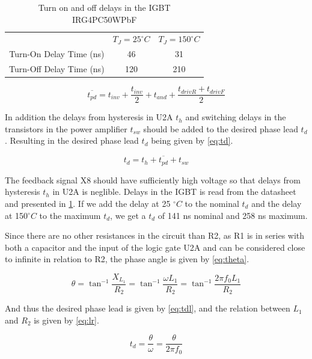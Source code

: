 \begin{table}[H]
    \centering
    \begin{tabular}{c|c|c}
                            & $T_J = 25 ^{\circ}C$ & $T_J = 150 ^{\circ}C$ \\
        Turn-On Delay Time (ns)  & 46                & 31    \\
        Turn-Off Delay Time (ns) & 120               & 210
    \end{tabular}
    \caption{Turn on and off delays in the IGBT IRG4PC50WPbF}
    \label{tab:tigbt}
\end{table}

\begin{equation} \label{eq:tpd}
    \overline{t_{pd}} = t_{inv} + \frac{t_{inv}}{2} + t_{and} + \frac{t_{driv R}+t_{driv F}}{2}
\end{equation}

In addition the delays from hysteresis in U2A $t_h$ and switching delays in the transistors in the power amplifier $t_{sw}$ should be added to the desired phase lead $t_{d}$. Resulting in the desired phase lead $t_{d}$ being given by \cref{eq:td}.

\begin{equation} \label{eq:td}
    t_d = t_{h} + \overline{t_{pd}} + t_{sw}
\end{equation}

The feedback signal X8 should have sufficiently high voltage so that delays from hysteresis $t_h$ in U2A is neglible. Delays in the IGBT is read from the datasheet and presented in \cref{tab:tigbt}. If we add the delay at 25 $^{\circ}C$ to the nominal $t_d$ and the delay at 150$^{\circ}C$ to the maximum $t_d$, we get a $t_d$ of 141 ns nominal and 258 ns maximum.

Since there are no other resistances in the circuit than R2, as R1 is in series with both a capacitor and the input of the logic gate U2A and can be considered close to infinite in relation to R2, the phase angle is given by \cref{eq:theta}.

\begin{equation} \label{eq:theta}
    \theta = {\tan}^{-1}\frac{X_{L_1}}{R_2} = {\tan}^{-1}\frac{\omega L_1}{R_2} = {\tan}^{-1}\frac{2 \pi f_0 L_1}{R_2}
\end{equation}

And thus the desired phase lead is given by \cref{eq:tdl}, and the relation between $L_1$ and $R_2$ is given by \cref{eq:lr}.

\begin{equation} \label{eq:tdl}
    t_{d} = \frac{\theta}{\omega} = \frac{\theta}{2 \pi f_0}
\end{equation}

